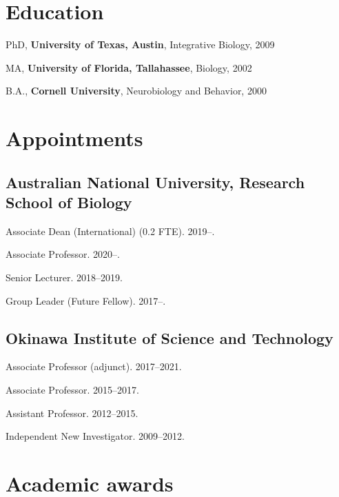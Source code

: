 \documentclass[11pt]{article}
\title{}
\def\printdate#1{\xprintdate#1-}
\def\xprintdate#1-#2-#3-{#1}
\def\daterange#1#2{\xprintdate#1---\xprintdate#2-}
\begin{document}
\maketitle

\section{Education}

\ind PhD, \textbf{University of Texas, Austin}, Integrative
Biology, \printdate{2009-05-01}


\ind MA, \textbf{University of Florida,
Tallahassee}, Biology, \printdate{2002-05-01}


\ind B.A., \textbf{Cornell University}, Neurobiology and
Behavior, \printdate{2000-05-01}



\section{Appointments}

\subsection{Australian National University, Research School of Biology}
\ind Associate Dean (International) (0.2 FTE). \printdate{2019-00-00}--.

\ind Associate Professor. \printdate{2020-01-01}--.

\ind Senior Lecturer. \daterange{2018-06-01}{2019-31-12}.

\ind Group Leader (Future Fellow). \printdate{2017-07-30}--.

\subsection{Okinawa Institute of Science and Technology}
\ind Associate Professor (adjunct). \daterange{2017-00-00}{2021-00-00}.

\ind Associate Professor. \daterange{2015-00-00}{2017-00-00}.

\ind Assistant Professor. \daterange{2012-00-00}{2015-00-00}.

\ind Independent New Investigator. \daterange{2009-08-00}{2012-00-00}.


\section{Academic awards}
\end{document}
